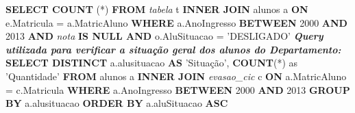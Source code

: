 \noindent \textbf{SELECT COUNT} (*) \newline
\textbf{FROM} \textit{tabela} t \textbf{INNER JOIN} alunos a
\textbf{ON} e.Matricula = a.MatricAluno \newline
\textbf{WHERE} a.AnoIngresso \textbf{BETWEEN} 2000 \textbf{AND} 2013
\textbf{AND} \textit{nota} \textbf{IS NULL  \newline AND} o.AluSituacao = 'DESLIGADO' \newline
\newline
\newline
\newline
\textit{\textbf{Query utilizada para verificar a situação geral dos alunos do Departamento:}}
\newline
\newline
\noindent \textbf{SELECT DISTINCT} a.alusituacao \textbf{AS} 'Situação', \textbf{COUNT}(*) as 'Quantidade' \newline
\textbf{FROM} alunos a \textbf{INNER JOIN} \textit{evasao\_cic} c
\textbf{ON} a.MatricAluno = c.Matricula \newline
\textbf{WHERE} a.AnoIngresso  \textbf{BETWEEN} 2000 \textbf{AND} 2013 \newline
\textbf{GROUP BY} a.alusituacao \newline
\textbf{ORDER BY} a.aluSituacao \textbf{ASC} \newline